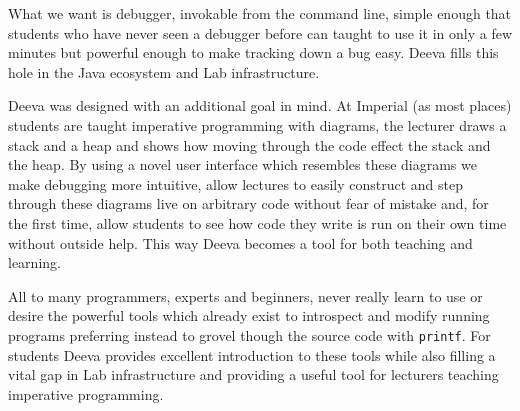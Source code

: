 \documentclass[11pt, a4paper]{article}
\newcommand{\cmd}[1]{{\tt #1}}
\begin{document}
What we want is debugger, invokable from the command line, simple enough that students who have never seen a debugger before can taught to use it in only a few minutes but powerful enough to make tracking down a bug easy. 
Deeva fills this hole in the Java ecosystem and Lab infrastructure.

Deeva was designed with an additional goal in mind.
At Imperial (as most places) students are taught imperative programming with diagrams, the lecturer draws a stack and a heap and shows how moving through the code effect the stack and the heap.
By using a novel user interface which resembles these diagrams we make debugging more intuitive, allow lectures to easily construct and step through these diagrams live on arbitrary code without fear of mistake and, for the first time, allow students to see how code they write is run on their own time without outside help.
This way Deeva becomes a tool for both teaching and learning.

All to many programmers, experts and beginners, never really learn to use or desire the powerful tools which already exist to introspect and modify running programs preferring instead to grovel though the source code with \cmd{printf}.
For students Deeva provides excellent introduction to these tools while also filling a vital gap in Lab infrastructure and providing a useful tool for lecturers teaching imperative programming.


% 

\end{document}
